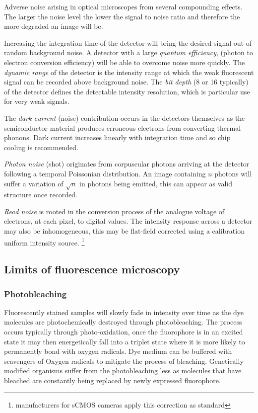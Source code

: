 Adverse noise arising in optical microscopes from several compounding effects.
The larger the noise level the lower the signal to noise ratio and therefore the more degraded an image will be.

Increasing the integration time of the detector will bring the desired signal out of random background noise.
A detector with a large \emph{quantum efficiency}, (photon to electron conversion efficiency) will be able to overcome noise more quickly.
The \emph{dynamic range} of the detector is the intensity range at which the weak fluorescent signal can be recorded above background noise.
The \emph{bit depth} (8 or \SI{16}{\bit} typically) of the detector defines the detectable intensity resolution, which is particular use for very weak signals.

The \emph{dark current} (noise) contribution occurs in the detectors themselves as the semiconductor material produces erroneous electrons from converting thermal phonons.
Dark current increases linearly with integration time and so chip cooling is recommended.

\emph{Photon noise} (shot) originates from corpuscular photons arriving at the detector following a temporal Poissonian distribution.
An image containing $n$ photons will suffer a variation of $\sqrt{n}$ in photons being emitted, this can appear as valid structure once recorded.

\emph{Read noise} is rooted in the conversion process of the analogue voltage of electrons, at each pixel, to digital values.
The intensity response across a detector may also be inhomogeneous, this may be flat-field corrected using a calibration uniform intensity source.
\footnote{manufacturers for sCMOS cameras apply this correction as standard}

\subsection{Limits of fluorescence microscopy}



\subsubsection{Photobleaching}

Fluorescently stained samples will slowly fade in intensity over time as the dye molecules are photochemically destroyed through photobleaching.
The process occurs typically through photo-oxidation, once the fluorophore is in an excited state it may then energetically fall into a triplet state where it is more likely to permanently bond with oxygen radicals.
Dye medium can be buffered with scavengers of Oxygen radicals to mitigate the process of bleaching.
Genetically modified organisms suffer from the photobleaching less as molecules that have bleached are constantly being replaced by newly expressed fluorophore.

